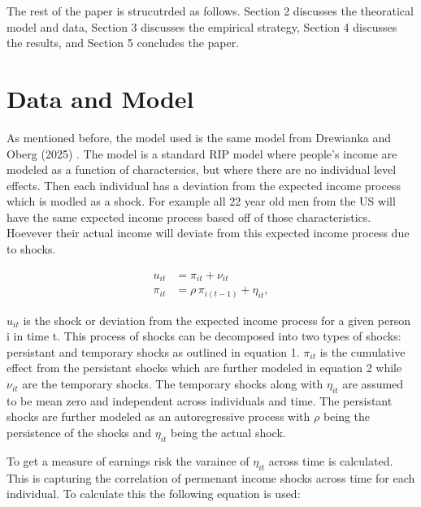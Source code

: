 \documentclass[12pt]{article}
\begin{document}
\begin{onehalfspace}




The rest of the paper is strucutrded as follows. Section 2 discusses the theoratical model and data, Section 3 discusses the empirical strategy, Section 4 discusses the results, and Section 5 concludes the paper. 



\section{Data and Model}







As mentioned before, the model used is the same model from Drewianka and Oberg (2025) \cite{drewianka2025}. The model is a standard RIP model where people's income are modeled as a function of charactersics, but where there are no individual level effects. Then each individual has a deviation from the expected income process which is modled as a shock. For example all 22 year old men from the US will have the same expected income process based off of those characteristics. Hoevever their actual income will deviate from this expected income process due to shocks. 



\begin{align}
u_{it} 
&= \pi_{it} + \nu_{it} \\[1ex]
\pi_{it} 
&= \rho\,\pi_{i(t-1)} + \eta_{it},
\end{align}


$u_{it}$ is the shock or deviation from the expected income process for a given person i in time t. This process of shocks can be decomposed into two types of shocks: persistant and temporary shocks as outlined in equation 1. $\pi_{it}$ is the cumulative effect from the persistant shocks which are further modeled in equation 2 while $\nu_{it}$ are the temporary shocks. The temporary shocks along with $\eta_{it}$ are assumed to be mean zero and independent across individuals and time. The persistant shocks are further modeled as an autoregressive process with $\rho$ being the persistence of the shocks and $\eta_{it}$ being the actual shock.



To get a measure of earnings risk the varaince of $\eta_{it}$ across time is calculated. This is capturing the correlation of permenant income shocks across time for each individual. To calculate this the following equation is used:




\end{onehalfspace}
\end{document}
